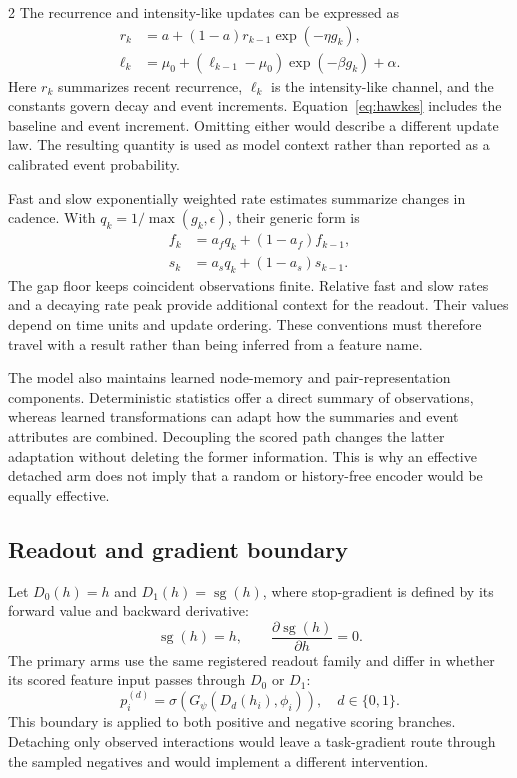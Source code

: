 \documentclass[a4paper,10pt]{article}
\newcommand{\sg}{\operatorname{sg}}
\begin{document}
\begin{multicols}{2}
The recurrence and intensity-like updates can be expressed as
\begin{align}
r_k&=a+(1-a)r_{k-1}\exp(-\eta g_k),\label{eq:recurrence}\\
\ell_k&=\mu_0+(\ell_{k-1}-\mu_0)\exp(-\beta g_k)+\alpha.
\label{eq:hawkes}
\end{align}
Here $r_k$ summarizes recent recurrence, $\ell_k$ is the intensity-like channel, and the constants govern decay and event increments. Equation~\eqref{eq:hawkes} includes the baseline and event increment. Omitting either would describe a different update law. The resulting quantity is used as model context rather than reported as a calibrated event probability.

Fast and slow exponentially weighted rate estimates summarize changes in cadence. With $q_k=1/\max(g_k,\epsilon)$, their generic form is
\begin{align}
f_k&=a_fq_k+(1-a_f)f_{k-1},\nonumber\\
s_k&=a_sq_k+(1-a_s)s_{k-1}.
\label{eq:rates}
\end{align}
The gap floor keeps coincident observations finite. Relative fast and slow rates and a decaying rate peak provide additional context for the readout. Their values depend on time units and update ordering. These conventions must therefore travel with a result rather than being inferred from a feature name.

The model also maintains learned node-memory and pair-representation components. Deterministic statistics offer a direct summary of observations, whereas learned transformations can adapt how the summaries and event attributes are combined. Decoupling the scored path changes the latter adaptation without deleting the former information. This is why an effective detached arm does not imply that a random or history-free encoder would be equally effective.

\subsection{Readout and gradient boundary}
Let $D_0(h)=h$ and $D_1(h)=\sg(h)$, where stop-gradient is defined by its forward value and backward derivative:
\begin{equation}
\sg(h)=h,\qquad \frac{\partial\sg(h)}{\partial h}=0.
\label{eq:sg}
\end{equation}
The primary arms use the same registered readout family and differ in whether its scored feature input passes through $D_0$ or $D_1$:
\begin{equation}
p_i^{(d)}=\sigma\!\left(G_\psi(D_d(h_i),\phi_i)\right),
\quad d\in\{0,1\}.
\label{eq:arms}
\end{equation}
This boundary is applied to both positive and negative scoring branches. Detaching only observed interactions would leave a task-gradient route through the sampled negatives and would implement a different intervention.


\end{multicols}
\end{document}
